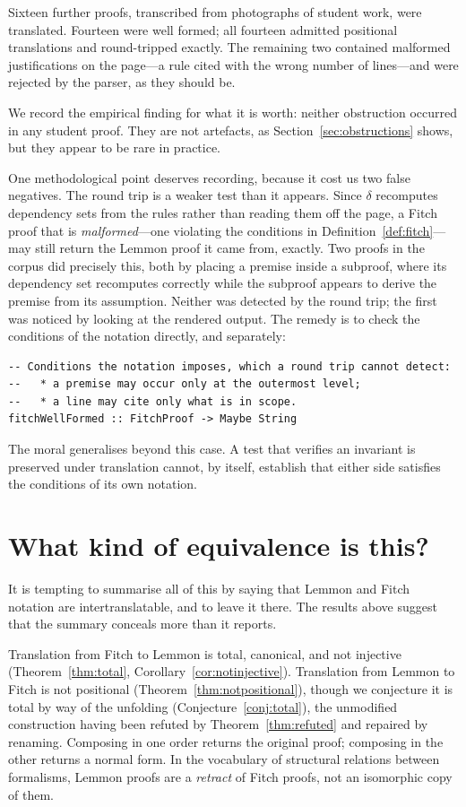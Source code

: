 \documentclass[11pt]{article}
\theoremstyle{plain}
\theoremstyle{definition}
\theoremstyle{remark}
\begin{document}
Sixteen further proofs, transcribed from photographs of student work, were
translated. Fourteen were well formed; all fourteen admitted positional
translations and round-tripped exactly. The remaining two contained malformed
justifications on the page---a rule cited with the wrong number of
lines---and were rejected by the parser, as they should be.

We record the empirical finding for what it is worth: neither obstruction
occurred in any student proof. They are not artefacts, as
Section~\ref{sec:obstructions} shows, but they appear to be rare in practice.

One methodological point deserves recording, because it cost us two false
negatives. The round trip is a weaker test than it appears. Since $\delta$
recomputes dependency sets from the rules rather than reading them off the
page, a Fitch proof that is \emph{malformed}---one violating the conditions in
Definition~\ref{def:fitch}---may still return the Lemmon proof it came from,
exactly. Two proofs in the corpus did precisely this, both by placing a
premise inside a subproof, where its dependency set recomputes correctly while
the subproof appears to derive the premise from its assumption. Neither was
detected by the round trip; the first was noticed by looking at the rendered
output. The remedy is to check the conditions of the notation directly, and
separately:

\begin{lstlisting}
-- Conditions the notation imposes, which a round trip cannot detect:
--   * a premise may occur only at the outermost level;
--   * a line may cite only what is in scope.
fitchWellFormed :: FitchProof -> Maybe String
\end{lstlisting}

\noindent The moral generalises beyond this case. A test that verifies an
invariant is preserved under translation cannot, by itself, establish that
either side satisfies the conditions of its own notation.

\section{What kind of equivalence is this?}\label{sec:equivalence}

It is tempting to summarise all of this by saying that Lemmon and Fitch
notation are intertranslatable, and to leave it there. The results above
suggest that the summary conceals more than it reports.

Translation from Fitch to Lemmon is total, canonical, and not injective
(Theorem~\ref{thm:total}, Corollary~\ref{cor:notinjective}). Translation from
Lemmon to Fitch is not positional (Theorem~\ref{thm:notpositional}), though we
conjecture it is total by way of the unfolding
(Conjecture~\ref{conj:total}), the unmodified construction having been refuted
by Theorem~\ref{thm:refuted} and repaired by renaming. Composing in one order returns the original
proof; composing in the other returns a normal form. In the vocabulary of
structural relations between formalisms, Lemmon proofs are a \emph{retract} of
Fitch proofs, not an isomorphic copy of them.
\end{document}
